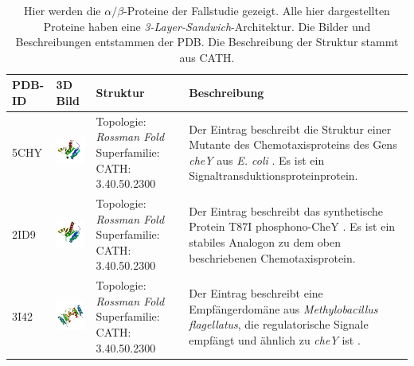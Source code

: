 \documentclass{article}
\begin{document}
\begin{table}
\begin{center}
\caption{Hier werden die $\alpha/\beta$-Proteine der Fallstudie gezeigt. Alle hier dargestellten Proteine haben eine \textit{3-Layer-Sandwich}-Architektur. Die Bilder und Beschreibungen entstammen der PDB. Die Beschreibung der Struktur stammt aus CATH.}
\begin{tabular}{ | C{9mm} | C{30mm} | C{29mm} | C{38mm} | }
\hline
PDB-ID & 3D Bild & Struktur & Beschreibung \\ \hline
5CHY  & \includegraphics[width=30mm, trim= -10 -5 -5 -10]{5CHY_bio_r_500.jpg} & Topologie: \newline \textit{\textit{Rossman Fold}} \newline Superfamilie: CATH: 3.40.50.2300 & Der Eintrag beschreibt die Struktur einer Mutante des Chemotaxisproteins des Gens \textit{cheY} aus \textit{E. coli} \cite{5chy}. Es ist ein Signaltransduktionsproteinprotein. \\ \hline
2ID9  & \includegraphics[width=30mm, trim= -10 -5 -5 -10]{2ID9_bio_r_500.jpg} & Topologie: \newline \textit{\textit{Rossman Fold}} \newline Superfamilie: CATH: 3.40.50.2300  & Der Eintrag beschreibt das synthetische Protein T87I phosphono-CheY \cite{2id9}. Es ist ein stabiles Analogon zu dem oben beschriebenen Chemotaxisprotein. \\ \hline
3I42  & \includegraphics[width=30mm, trim= -10 -5 -5 -10]{3I42_bio_r_500.jpg} & Topologie: \newline \textit{\textit{Rossman Fold}} \newline Superfamilie: CATH: 3.40.50.2300  & Der Eintrag beschreibt eine Empfängerdom\"ane aus \textit{Methylobacillus flagellatus}, die regulatorische Signale empf\"angt und \"ahnlich zu \textit{cheY} ist \cite{3i42}.  \\ \hline

\end{tabular}
\end{center}
\end{table}
\end{document}
